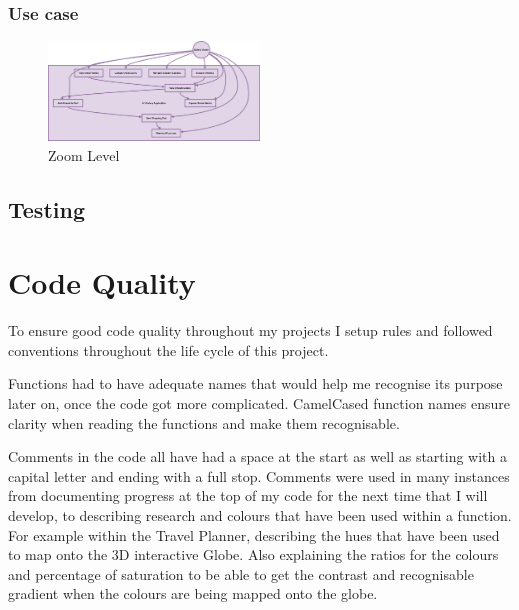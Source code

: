 \documentclass[]{project_final}
\begin{document}
\subsubsection{Use case}

\begin{figure}[ht!]
  \centering
  \includegraphics[width=0.5\textwidth]{AGUseCase.png}
  \vspace*{0.0cm}
  \caption{Zoom Level}
  \label{fig:1}
\end{figure}
\newpage
\subsection{Testing}
\section{Code Quality}
To ensure good code quality throughout my projects I setup rules and followed conventions throughout the life cycle of this project.

Functions had to have adequate names that would help me recognise its purpose later on, once the code got more complicated. CamelCased function names ensure clarity when reading the functions and make them recognisable.

Comments in the code all have had a space at the start as well as starting with a capital letter and ending with a full stop. Comments were used in many instances from documenting progress at the top of my code for the next time that I will develop, to describing research and colours that have been used within a function. For example within the Travel Planner, describing the hues that have been used to map onto the 3D interactive Globe. Also explaining the ratios for the colours and percentage of saturation to be able to get the contrast and recognisable gradient when the colours are being mapped onto the globe.
\end{document}
